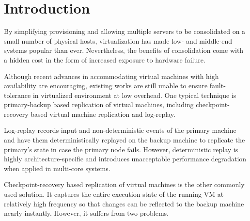 \section{Introduction} \label{sec:intro}

By simplifying provisioning and allowing multiple servers to be consolidated on a 
small number of physical hosts, virtualization has made low- and middle-end systems 
popular than ever. Nevertheless, the benefits of consolidation come with a hidden cost 
in the form of increased exposure to hardware failure. 

Although recent advances in accommodating virtual machines with high availability 
are encouraging, existing works are still unable to ensure fault-tolerance in virtualized 
environment at low overhead. One typical technique is primary-backup based replication of 
virtual machines, including checkpoint-recovery based virtual machine replication and log-replay.

Log-replay records input and non-deterministic events of the primary machine 
and have them deterministically replayed on the backup machine to replicate the primary's state 
in case the primary node fails. However, deterministic replay is highly architecture-specific and 
introduces unacceptable performance degradation when applied in multi-core systems.


Checkpoint-recovery based replication of virtual machines is the other commonly used solution. 
It captures the entire execution state of the running VM at relatively high frequency so that changes 
can be reflected to the backup machine nearly instantly. However, it suffers from two problems.


